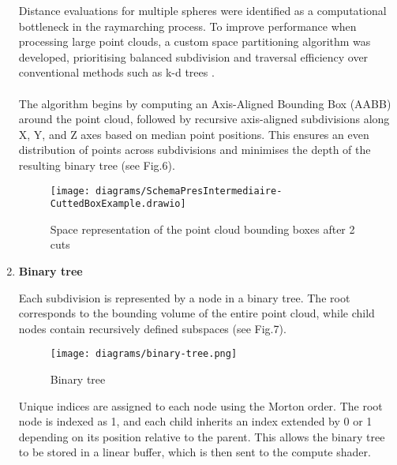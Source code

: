 \documentclass{rapportcs}
\begin{document}
        \begin{enumerate}
    
        Distance evaluations for multiple spheres were identified as a computational bottleneck in the raymarching process.
        To improve performance when processing large point clouds, a custom space partitioning algorithm was developed, prioritising balanced subdivision and traversal efficiency over conventional methods such as k-d trees \cite{Bruce_Naylor_Partitioning_Trees}.\\\\
    
        The algorithm begins by computing an Axis-Aligned Bounding Box (AABB) around the point cloud, followed by recursive axis-aligned subdivisions along X, Y, and Z axes based on median point positions.
        This ensures an even distribution of points across subdivisions and minimises the depth of the resulting binary tree (see Fig.6).
        
        \begin{figure}[H]
            \centering
            \texttt{[image: diagrams/SchemaPresIntermediaire-CuttedBoxExample.drawio]}
            \caption{Space representation of the point cloud bounding boxes after 2 cuts}
            \label{fig:label_image}
        \end{figure}

       \item \textbf{Binary tree}
       
        Each subdivision is represented by a node in a binary tree.
        The root corresponds to the bounding volume of the entire point cloud, while child nodes contain recursively defined subspaces (see Fig.7).\\
    
        \begin{figure}[H]
            \centering
            \texttt{[image: diagrams/binary-tree.png]}
            \caption{Binary tree}
            \label{fig:label_image}
        \end{figure}

        \noindent Unique indices are assigned to each node using the Morton order.
        The root node is indexed as 1, and each child inherits an index extended by 0 or 1 depending on its position relative to the parent.
        This allows the binary tree to be stored in a linear buffer, which is then sent to the compute shader.\\


\end{enumerate}
\end{document}
